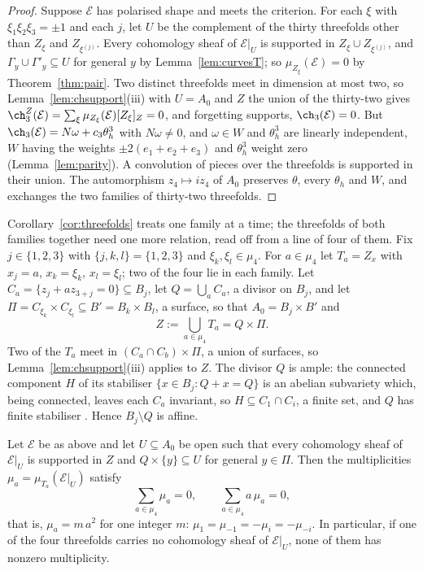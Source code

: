 \begin{proof}
Suppose $\mathcal{E}$ has polarised shape and meets the criterion. For each $\xi$ with $\xi_{1}\xi_{2}\xi_{3}=\pm1$ and each $j$, let $U$ be the complement of the thirty threefolds other than $Z_{\xi}$ and $Z_{\xi^{(j)}}$. Every cohomology sheaf of $\mathcal{E}|_{U}$ is supported in $Z_{\xi}\cup Z_{\xi^{(j)}}$, and $\Gamma_{y}\cup\Gamma'_{y}\subseteq U$ for general $y$ by Lemma~\ref{lem:curvesT}; so $\mu_{Z_{\xi}}(\mathcal{E})=0$ by Theorem~\ref{thm:pair}. Two distinct threefolds meet in dimension at most two, so Lemma~\ref{lem:chsupport}(iii) with $U=A_{0}$ and $Z$ the union of the thirty-two gives $\ch^{Z}_{3}(\mathcal{E})=\sum_{\xi}\mu_{Z_{\xi}}(\mathcal{E})[Z_{\xi}]_{Z}=0$, and forgetting supports, $\ch_{3}(\mathcal{E})=0$. But $\ch_{3}(\mathcal{E})=N\omega+c_{3}\theta_{h}^{3}$ with $N\omega\ne0$, and $\omega\in W$ and $\theta_{h}^{3}$ are linearly independent, $W$ having the weights $\pm2(e_{1}+e_{2}+e_{3})$ and $\theta_{h}^{3}$ weight zero (Lemma~\ref{lem:parity}). A convolution of pieces over the threefolds is supported in their union. The automorphism $z_{4}\mapsto iz_{4}$ of $A_{0}$ preserves $\theta$, every $\theta_{h}$ and $W$, and exchanges the two families of thirty-two threefolds.
\end{proof}

Corollary~\ref{cor:threefolds} treats one family at a time; the threefolds of both families together need one more relation, read off from a line of four of them. Fix $j\in\{1,2,3\}$ with $\{j,k,l\}=\{1,2,3\}$ and $\xi_{k},\xi_{l}\in\mu_{4}$. For $a\in\mu_{4}$ let $T_{a}=Z_{x}$ with $x_{j}=a$, $x_{k}=\xi_{k}$, $x_{l}=\xi_{l}$; two of the four lie in each family. Let $C_{a}=\{z_{j}+az_{3+j}=0\}\subseteq B_{j}$, let $Q=\bigcup_{a}C_{a}$, a divisor on $B_{j}$, and let $\Pi=C_{\xi_{k}}\times C_{\xi_{l}}\subseteq B'=B_{k}\times B_{l}$, a surface, so that $A_{0}=B_{j}\times B'$ and
\[
Z:=\bigcup_{a\in\mu_{4}}T_{a}=Q\times\Pi .
\]
Two of the $T_{a}$ meet in $(C_{a}\cap C_{b})\times\Pi$, a union of surfaces, so Lemma~\ref{lem:chsupport}(iii) applies to $Z$. The divisor $Q$ is ample: the connected component $H$ of its stabiliser $\{x\in B_{j}:Q+x=Q\}$ is an abelian subvariety which, being connected, leaves each $C_{a}$ invariant, so $H\subseteq C_{1}\cap C_{i}$, a finite set, and $Q$ has finite stabiliser \cite[\S6, Application~1]{Mum70}. Hence $B_{j}\setminus Q$ is affine.

\begin{lemma}\label{lem:fourline}
Let $\mathcal{E}$ be as above and let $U\subseteq A_{0}$ be open such that every cohomology sheaf of $\mathcal{E}|_{U}$ is supported in $Z$ and $Q\times\{y\}\subseteq U$ for general $y\in\Pi$. Then the multiplicities $\mu_{a}=\mu_{T_{a}}(\mathcal{E}|_{U})$ satisfy
\[
\sum_{a\in\mu_{4}}\mu_{a}=0,\qquad\sum_{a\in\mu_{4}}a\,\mu_{a}=0,
\]
that is, $\mu_{a}=m\,a^{2}$ for one integer $m$: $\mu_{1}=\mu_{-1}=-\mu_{i}=-\mu_{-i}$. In particular, if one of the four threefolds carries no cohomology sheaf of $\mathcal{E}|_{U}$, none of them has nonzero multiplicity.
\end{lemma}

